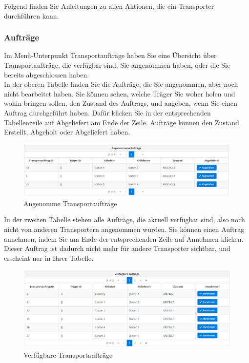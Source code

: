 \documentclass[enabledeprecatedfontcommands,fontsize=12pt,paper=a4,twoside]{scrartcl}
\begin{document}
Folgend finden Sie Anleitungen zu allen Aktionen, die ein Transporter durchführen kann. \\

\subsubsection{Aufträge}
Im Menü-Unterpunkt Transportaufträge haben Sie eine Übersicht über Transportaufträge, die verfügbar sind, Sie angenommen haben, oder die Sie bereits abgeschlossen haben. \\

In der oberen Tabelle finden Sie die Aufträge, die Sie angenommen, aber noch nicht bearbeitet haben. Sie können sehen, welche Träger Sie woher holen und wohin bringen sollen, den Zustand des Auftrags, und angeben, wenn Sie einen Auftrag durchgeführt haben. Dafür klicken Sie in der entsprechenden Tabellenzeile auf Abgeliefert am Ende der Zeile. Aufträge können den Zustand Erstellt, Abgeholt oder Abgeliefert haben. \\

\begin{figure}[h!]
\begin{center}
 \includegraphics[width=\textwidth]{screenshots/tr/angenommen.png}
  \caption{Angenomme Transportaufträge}
  \label{fig:boat2}
\end{center}
\end{figure}


In der zweiten Tabelle stehen alle Aufträge, die aktuell verfügbar sind, also noch nicht von anderen Transportern angenommen wurden. Sie können einen Auftrag annehmen, indem Sie am Ende der entsprechenden Zeile auf Annehmen klicken. Dieser Auftrag ist dadurch nicht mehr für andere Transporter sichtbar, und erscheint nur in Ihrer Tabelle. \\

\begin{figure}[h!]
\begin{center}
 \includegraphics[width=\textwidth]{screenshots/tr/verfuegbar.png}
  \caption{Verfügbare Transportaufträge}
  \label{fig:boat2}
\end{center}
\end{figure}
\end{document}
